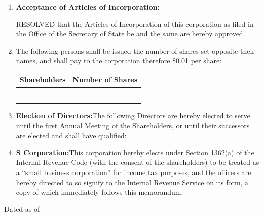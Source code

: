 \begin{enumerate}[leftmargin=*, label=\arabic*.]
	\item \textbf{Acceptance of Articles of Incorporation:}

	\smallskip
	RESOLVED that the Articles of Incorporation of this corporation as filed in the Office of
	the Secretary of State be and the same are hereby approved.

	\item The following persons shall be issued the number of shares set opposite their names,
	and shall pay to the corporation therefore \$0.01 per share:

	\smallskip
	\begin{center}
		\begin{tabular}{@{}lr@{}}
			\toprule
			\textbf{Shareholders} & \textbf{Number of Shares} \\
			\midrule
			\shareholderOne   & \sharesOne   \\
			\shareholderTwo   & \sharesTwo   \\
			\shareholderThree & \sharesThree \\
			\shareholderFour  & \sharesFour  \\
			\shareholderFive  & \sharesFive  \\
			\shareholderSix   & \sharesSix   \\
			\bottomrule
		\end{tabular}
	\end{center}

	\item \textbf{Election of Directors:}\enspace The following Directors are hereby elected to
	serve until the first Annual Meeting of the Shareholders, or until their successors are
	elected and shall have qualified:

	\smallskip
	\noindent\makebox[0.48\textwidth][l]{\shareholderOne}\makebox[0.48\textwidth][l]{\shareholderTwo}\par
	\noindent\makebox[0.48\textwidth][l]{\shareholderThree}\makebox[0.48\textwidth][l]{\shareholderFour}\par
	\noindent\makebox[0.48\textwidth][l]{\shareholderFive}\makebox[0.48\textwidth][l]{\shareholderSix}\par

	\item \textbf{S Corporation:}\enspace This corporation hereby elects under Section 1362(a)
	of the Internal Revenue Code (with the consent of the shareholders) to be treated as a
	``small business corporation'' for income tax purposes, and the officers are hereby directed
	to so signify to the Internal Revenue Service on its form, a copy of which immediately follows
	this memorandum.
\end{enumerate}

\bigskip
\noindent Dated as of \datedText

\bigskip
\sigpair{\shareholderOne}{\shareholderFive}
\sigpair{\shareholderTwo}{\shareholderSix}
\sigpair{\shareholderFour}{\shareholderThree}
